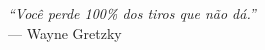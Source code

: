 \begin{epigrafe}
    \vspace*{\fill}
    \begin{flushright}
        \textit{``Você perde 100\% dos tiros que não dá.''}\\
        --- Wayne Gretzky
    \end{flushright}
\end{epigrafe}

